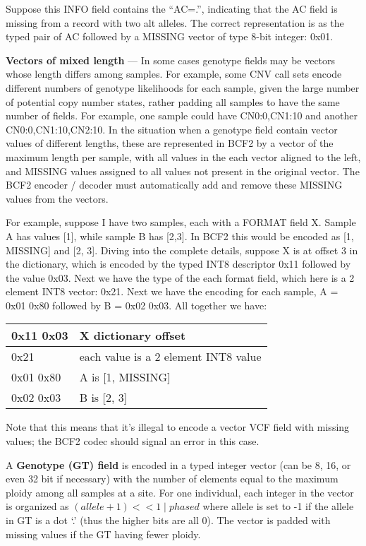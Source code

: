 \documentclass[8pt]{article}
\begin{document}
Suppose this INFO field contains the ``AC=.'', indicating that the AC field is missing from a record with two alt alleles.  The correct representation is as the typed pair of AC followed by a MISSING vector of type 8-bit integer: 0x01.

\vspace{0.3cm}
\textbf{Vectors of mixed length} --- In some cases genotype fields may be vectors whose length differs among samples.  For example, some CNV call sets encode different numbers of genotype likelihoods for each sample, given the large number of potential copy number states, rather padding all samples to have the same number of fields.  For example, one sample could have CN0:0,CN1:10 and another CN0:0,CN1:10,CN2:10.  In the situation when a genotype field contain vector values of different lengths, these are represented in BCF2 by a vector of the maximum length per sample, with all values in the each vector aligned to the left, and MISSING values assigned to all values not present in the original vector.  The BCF2 encoder / decoder must automatically add and remove these MISSING values from the vectors.

For example, suppose I have two samples, each with a FORMAT field X.  Sample A has values [1], while sample B has [2,3].  In BCF2 this would be encoded as [1, MISSING] and [2, 3].  Diving into the complete details, suppose X is at offset 3 in the dictionary, which is encoded by the typed INT8 descriptor 0x11 followed by the value 0x03.  Next we have the type of the each format field, which here is a 2 element INT8 vector: 0x21.  Next we have the encoding for each sample, A = 0x01 0x80 followed by B = 0x02 0x03.  All together we have:

\vspace{0.3cm}
\begin{tabular}{|p{2cm} | l |} \hline
0x11 0x03 & X dictionary offset \\ \hline
0x21 & each value is a 2 element INT8 value \\ \hline
0x01 0x80 & A is [1, MISSING] \\ \hline
0x02 0x03 & B is [2, 3] \\ \hline
\end{tabular}
\vspace{0.3cm}

Note that this means that it's illegal to encode a vector VCF field with missing values; the BCF2 codec should signal an error in this case.

\vspace{0.3cm}
A \textbf{Genotype (GT) field} is encoded in a typed integer vector (can be 8, 16, or even 32 bit if necessary) with the number of elements equal to the maximum ploidy among all samples at a site.  For one individual, each integer in the vector is organized as $(allele+1) << 1 \mid phased$ where allele is set to -1 if the allele in GT is a dot `.' (thus the higher bits are all 0).  The vector is padded with missing values if the GT having fewer ploidy.
\end{document}
